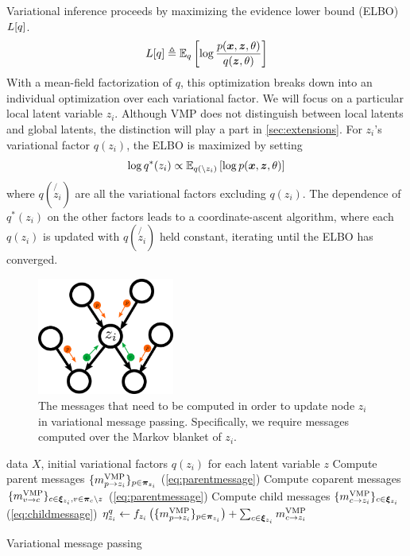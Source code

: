 Variational inference proceeds by
maximizing the evidence lower bound (ELBO) $L[q]$.
\begin{equation}
    L[q] \triangleq \mathbb{E}_q\left[\log \frac{p(\bm{x}, \bm{z}, \theta)}{q(\bm{z}, \theta)}\right]
\end{equation}
With a mean-field factorization of $q$, this optimization
breaks down into an individual optimization
over each variational factor. 
We will focus on a particular local latent variable $z_i$.
Although VMP does not distinguish between local latents
and global latents, the distinction will play a part in \autoref{sec:extensions}.
For $z_i$'s variational factor $q(z_i)$,
the ELBO is maximized by setting
\begin{equation}
    \log q^*(z_i) \propto \mathbb{E}_{q(\backslash z_i)} \left[
    \log p(\bm{x}, \bm{z}, \theta)\right]
\end{equation}
where $q(\not{z_i})$ are all the variational factors excluding $q(z_i)$.
The dependence of $q^*(z_i)$ on the other factors leads
to a coordinate-ascent algorithm, where 
each $q(z_i)$ is updated with $q(\not{z_i})$ held constant,
iterating until
the ELBO has converged.

\begin{figure}[htp!]
    \centering
    \includegraphics[width=0.4\textwidth]{img/nvmp/vmp-4}
    \caption{The messages that need to be computed in order to update
    node $z_i$ in variational message passing. Specifically, we require
    messages computed over the Markov blanket of $z_i$.}
    \label{fig:vmp}
\end{figure}
\begin{algorithm}[htp!]
\begin{algorithmic}
    data $X$, initial variational factors $q(z_i)$ for each latent variable $z$
   \REPEAT
   \STATE Compute parent messages $\{m^{\text{VMP}}_{p \rightarrow z_i}\}_{p \in \bm{\pi}_{z_i}}$ (\autoref{eq:parentmessage})
   \STATE Compute coparent messages $\{m^{\text{VMP}}_{v \rightarrow c}\}_{c \in \bm{\xi}_{z_i}, v \in \bm{\pi}_c \backslash z}$ (\autoref{eq:parentmessage})
   \STATE Compute child messages $\{m^{\text{VMP}}_{c \rightarrow z_i}\}_{c \in \bm{\xi}_{z_i}}$
   (\autoref{eq:childmessage})
   \STATE $\eta^q_{z_i} \leftarrow f_{z_i}\left(\{m^{\text{VMP}}_{p \rightarrow z_i}\}_{p \in \bm{\pi}_{z_i}}\right) + \sum_{c \in \bm{\xi}_{z_i}} m^{\text{VMP}}_{c \rightarrow z_i}$ 
   \ENDFOR
\end{algorithmic}
   \caption{Variational message passing}
   \label{alg:vmp}
\end{algorithm}


